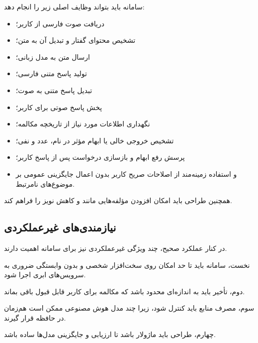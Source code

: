سامانه باید بتواند وظایف اصلی زیر را انجام دهد:

\begin{itemize}

    \item دریافت صوت فارسی از کاربر؛

    \item تشخیص محتوای گفتار و تبدیل آن به متن؛

    \item ارسال متن به مدل زبانی؛

    \item تولید پاسخ متنی فارسی؛

    \item تبدیل پاسخ متنی به صوت؛

    \item پخش پاسخ صوتی برای کاربر؛

    \item نگهداری اطلاعات مورد نیاز از تاریخچه مکالمه؛

    \item تشخیص خروجی خالی یا ابهام مؤثر در نام، عدد و نفی؛

    \item پرسش رفع ابهام و بازسازی درخواست پس از پاسخ کاربر؛

    \item و استفاده زمینه‌مند از اصلاحات صریح کاربر بدون اعمال
    جایگزینی عمومی بر موضوع‌های نامرتبط.

\end{itemize}

همچنین طراحی باید امکان افزودن مؤلفه‌هایی مانند
و کاهش نویز را فراهم کند.


\subsection{نیازمندی‌های غیرعملکردی}

در کنار عملکرد صحیح، چند ویژگی غیرعملکردی نیز برای سامانه
اهمیت دارند.

نخست، سامانه باید تا حد امکان روی سخت‌افزار شخصی و بدون
وابستگی ضروری به سرویس‌های ابری اجرا شود.

دوم، تأخیر باید به اندازه‌ای محدود باشد که مکالمه برای کاربر
قابل قبول باقی بماند.

سوم، مصرف منابع باید کنترل شود، زیرا چند مدل هوش مصنوعی
ممکن است هم‌زمان در حافظه قرار گیرند.

چهارم، طراحی باید ماژولار باشد تا ارزیابی و جایگزینی مدل‌ها
ساده باشد.

